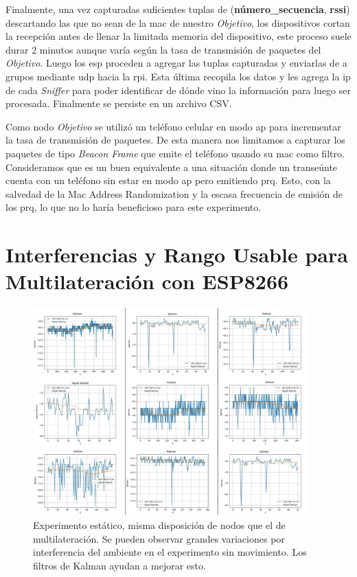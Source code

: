 Finalmente, una vez capturadas suficientes tuplas de (\textbf{número\_secuencia}, \textbf{rssi}) descartando las que no sean de la \acs{mac} de nuestro \textit{Objetivo}, los dispositivos cortan la recepción antes de llenar la limitada memoria del dispositivo, este proceso suele durar 2 minutos aunque varía según la tasa de transmisión de paquetes del \textit{Objetivo}. Luego los \acs{esp} proceden a agregar las tuplas capturadas y enviarlas de a grupos mediante \acs{udp} hacia la \acs{rpi}. Esta última recopila los datos y les agrega la \acs{ip} de cada \textit{Sniffer} para poder identificar de dónde vino la información para luego ser procesada. Finalmente se persiste en un archivo CSV.

Como nodo \textit{Objetivo} se utilizó un teléfono celular en modo \acl{ap} para incrementar la tasa de transmisión de paquetes. De esta manera nos limitamos a capturar los paquetes de tipo \textit{Beacon Frame} que emite el teléfono usando su \acs{mac} como filtro. Consideramos que es un buen equivalente a una situación donde un transeúnte cuenta con un teléfono sin estar en modo \acl{ap} pero emitiendo \acl{prq}. Esto, con la salvedad de la Mac Address Randomization y la escasa frecuencia de emisión de los \acl{prq}, lo que no lo haría beneficioso para este experimento.

\section{Interferencias y Rango Usable para Multilateración con ESP8266}
\begin{figure}[!htb]
	\centering
	\includegraphics[width=0.95\textwidth]{Figuras/errores/estatico-medio.jpg}
	\captionsetup{margin=1cm}
	\caption[ Experimento estático]{ Experimento estático, misma disposición de nodos que el de multilateración. Se pueden observar grandes variaciones por interferencia del ambiente en el experimento sin movimiento. Los filtros de Kalman ayudan a mejorar esto.}
	\label{fig:errores-estatico}
\end{figure}
